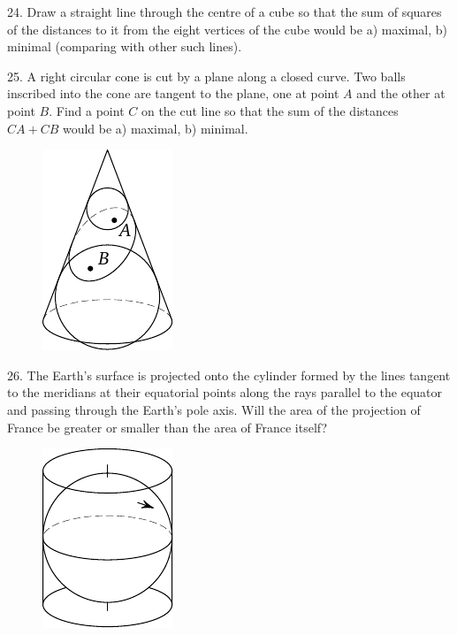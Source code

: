 \begin{problem}{24.}
	Draw a straight line through the centre of a cube so that the sum of squares of the distances to it
	from the eight vertices of the cube would be
	a) maximal,
	b) minimal (comparing with other such lines).
\end{problem}

\begin{problem}{25.}
	A right circular cone is cut by a plane along a closed curve. Two balls inscribed into the cone
	are tangent to the plane, one at point $A$ and the other at point $B$. Find a point $C$ on the cut line so
	that the sum of the distances $CA + CB$ would be a) maximal, b) minimal.
	\begin{figure}
		\includegraphics{taskbook-9}
	\end{figure}
\end{problem}

\begin{problem}{26.}
	The Earth's surface is projected onto the cylinder formed by the lines tangent to the meridians
	at their equatorial points along the rays parallel to the equator and passing through the Earth's pole axis.
	Will the area of the projection of France be greater or smaller than the area of France itself?
	\begin{figure}
		\includegraphics{taskbook-10}
	\end{figure}
\end{problem}

